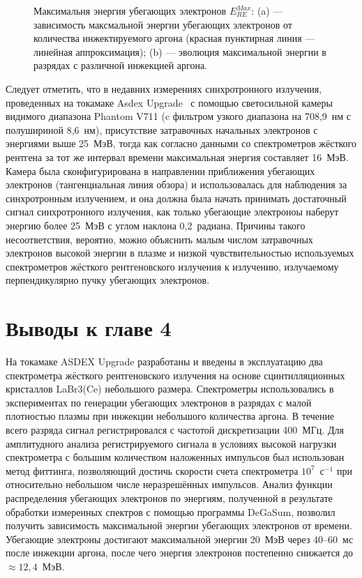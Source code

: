 \begin{figure}[ht!]
  \caption{ Максимальня энергия убегающих электронов $ E_{RE}^{Max}$: (a) --- зависимость максмальной энергии убегающих электронов от количества инжектируемого аргона (красная пунктирная линия --- линейная аппроксимация); (b) --- эволюция максимальной энергии в разрядах с различной инжекцией аргона.~\cite{Shevelev2021} }
  \label{fig:asdexMaxElectronEnergy}
\end{figure}

Следует отметить, что в недавних измерениях синхротронного излучения, проведенных на токамаке Asdex Upgrade~\cite{PazSoldan2017} с помощью светосильной камеры видимого диапазона Phantom V711 (c фильтром узкого диапазона на 708,9~нм с полушириной 8,6~нм), присутствие затравочных начальных электронов с энергиями выше 25~МэВ, тогда как согласно данными со спектрометров жёсткого рентгена за тот же интервал времени  максимальная энергия составляет 16~МэВ. Камера была сконфигурирована в направлении приближения убегающих электронов (тангенциальная линия обзора) и использовалась для наблюдения за синхротронным излучением, и она должна была начать принимать достаточный сигнал синхротронного излучения, как только убегающие электроноы наберут энергию более 25~МэВ с углом наклона 0,2~радиана. Причины такого несоответствия, вероятно, можно объяснить малым числом затравочных электронов высокой энергии в плазме и низкой чувствительностью используемых спектрометров жёсткого рентгеновского излучения к излучению, излучаемому перпендикулярно пучку убегающих электронов.


\section{Выводы к главе 4}

На токамаке ASDEX Upgrade разработаны и введены в эксплуатацию два спектрометра жёсткого рентгеновского излучения на основе сцинтилляционных кристаллов LaBr3(Ce) небольшого размера. Спектрометры использовались в экспериментах по генерации убегающих электронов в разрядах с малой плотностью плазмы при инжекции небольшого количества аргона. В течение всего разряда сигнал регистрировался с частотой дискретизации 400~МГц. Для амплитудного анализа регистрируемого сигнала в условиях высокой нагрузки спектрометра с большим количеством наложенных импульсов был использован метод фиттинга, позволяющий достичь скорости счета спектрометра $10^7$~с${}^{-1}$ при относительно небольшом числе неразрешённых импульсов. Анализ функции распределения убегающих электронов по энергиям, полученной в результате обработки измеренных спектров с помощью программы DeGaSum, позволил получить зависимость максимальной энергии убегающих электронов от времени. Убегающие электроны достигают максимальной энергии 20~МэВ через 40--60~мс после инжекции аргона, после чего энергия электронов постепенно снижается до $\approx{12,4}$~МэВ.

